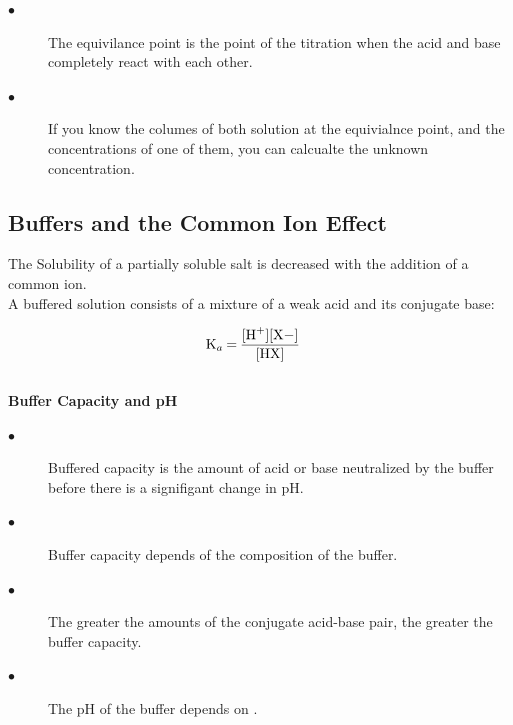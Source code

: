 \documentclass{article}
\begin{document}
\begin{paragraph}
\begin{description}
\item[$\bullet$]\noindent  The equivilance point is the point of the titration when the acid and base completely react with each other.

\item[$\bullet$]\noindent If you know the columes of both solution at the equivialnce point, and the concentrations of one of them, you can calcualte the unknown concentration.
 \end{description}
 \subsection{Buffers and the Common Ion Effect}
 \vspace{2mm}
 The Solubility of a partially soluble salt is decreased with the addition of a common ion.\\

 \noindent
 A buffered solution consists of a mixture of a weak acid and its conjugate base:

 \begin{center}
 \end{center}

 \begin{align*}
   \ce{K_a &= \frac{[H+][X-]}{[HX]}}
 \end{align*}
\\
\textbf{Buffer Capacity and pH}
\\
\begin{description}
\item[$\bullet$]\noindent Buffered capacity is the amount of acid or base neutralized by the buffer before there is a signifigant change in pH.
\item[$\bullet$]\noindent Buffer capacity depends of the composition of the buffer.
\item[$\bullet$]\noindent The greater the amounts of the conjugate acid-base pair, the greater the buffer capacity.
\item[$\bullet$]\noindent The pH of the buffer depends on .
\end{description}


\end{paragraph}
\end{document}
